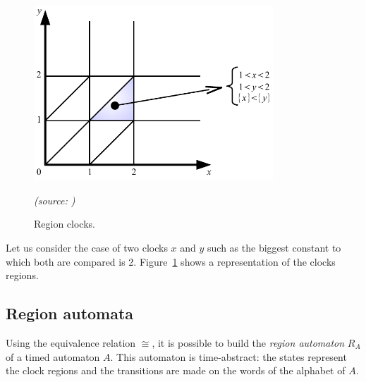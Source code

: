 \begin{figure}[htbp]
		\centering
    \includegraphics[width=0.8\textwidth]{content/timed-automata/region-clocks}
    \begin{flushright}
    	\textit{(source: \cite{BL-VAT06})}
    \end{flushright}
    \caption{Region clocks.}
    \label{fig:region-clocks}
\end{figure}

Let us consider the case of two clocks $x$ and $y$ such as the biggest constant to which both are compared is 2. Figure~\ref{fig:region-clocks} shows a representation of the clocks regions.


\subsection{Region automata}


Using the equivalence relation $\cong$, it is possible to build the \emph{region automaton} $R_A$ of a timed automaton $A$. This automaton is time-abstract: the states represent the clock regions and the transitions are made on the words of the alphabet of $A$.

